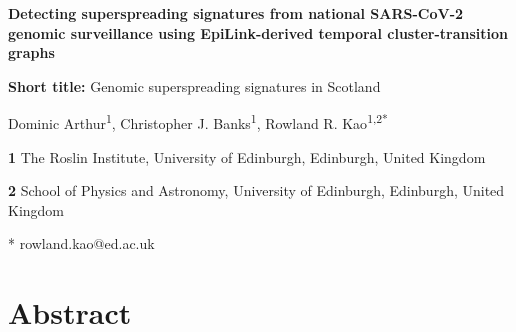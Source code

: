 \documentclass[10pt,letterpaper]{article}
\begin{document}
\vspace*{0.2in}
\begin{flushleft}

	{\Large\bfseries Detecting superspreading signatures from national SARS-CoV-2 genomic surveillance using EpiLink-derived temporal cluster-transition graphs}

	\medskip
	\textbf{Short title:} Genomic superspreading signatures in Scotland

	\bigskip

	Dominic Arthur\textsuperscript{1},
	Christopher J. Banks\textsuperscript{1},
	Rowland R. Kao\textsuperscript{1,2*}

	\bigskip

	\textbf{1} The Roslin Institute, University of Edinburgh, Edinburgh, United Kingdom

	\textbf{2} School of Physics and Astronomy, University of Edinburgh, Edinburgh, United Kingdom

	\bigskip

	* rowland.kao@ed.ac.uk
\end{flushleft}

\section*{Abstract}
\end{document}
